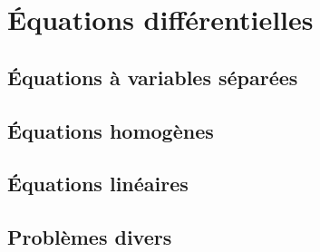 
					\section{Équations différentielles}

					\subsection{Équations à variables séparées}


					\subsection{Équations homogènes}


					\subsection{Équations linéaires}


					\subsection{Problèmes divers}

